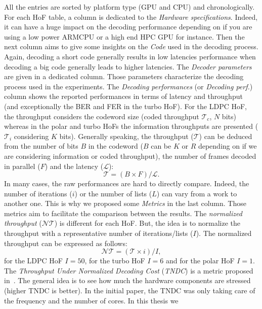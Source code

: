 All the entries are sorted by platform type (GPU and CPU) and chronologically.
For each HoF table, a column is dedicated to the \emph{Hardware specifications}.
Indeed, it can have a huge impact on the decoding performance depending on if
you are using a low power ARM\R CPU or a high end HPC GPU for instance. Then the
next column aims to give some insights on the \emph{Code} used in the decoding
process. Again, decoding a short code generally results in low latencies
performance when decoding a big code generally leads to higher latencies. The
\emph{Decoder parameters} are given in a dedicated column. Those parameters
characterize the decoding process used in the experiments. The \emph{Decoding
performances} (or \emph{Decoding perf.}) column shows the reported performances
in terms of latency and throughput (and exceptionally the BER and FER in the
turbo HoF). For the LDPC HoF, the throughput considers the codeword size (coded
throughput $\mathcal{T}_c$, $N$ bits) whereas in the polar and turbo HoFs the
information throughputs are presented ($\mathcal{T}_i$ considering $K$ bits).
Generally speaking, the throughput ($\mathcal{T}$) can be deduced from the
number of bits $B$ in the codeword ($B$ can be $K$ or $R$ depending on if we are
considering information or coded throughput), the number of frames decoded in
parallel ($F$) and the latency ($\mathcal{L}$):
\begin{equation}
  \mathcal{T} = (B \times F) / \mathcal{L}.
\end{equation}
In many cases, the raw performances are hard to directly compare. Indeed, the
number of iterations ($i$) or the number of lists ($L$) can vary from a work to
another one. This is why we proposed some \emph{Metrics} in the last column. Those
metrics aim to facilitate the comparison between the results. The
\emph{normalized throughput} ($\mathcal{NT}$) is different for each HoF. But,
the idea is to normalize the throughput with a representative number of
iterations/lists ($I$). The normalized throughput can be expressed as follows:
\begin{equation}
  \mathcal{NT} = (\mathcal{T} \times i) / I,
\end{equation}
for the LDPC HoF $I = 50$, for the turbo HoF $I = 6$ and for the polar HoF
$I = 1$.
The \emph{Throughput Under Normalized Decoding Cost} (\emph{TNDC}) is a metric
proposed in~\cite{Ying2012}. The general idea is to see how much the hardware
components are stressed (higher TNDC is better). In the initial paper, the TNDC
was only taking care of the frequency and the number of cores. In this thesis we
